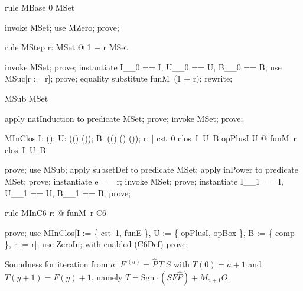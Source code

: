 \documentclass{article}
\begin{document}
\begin{theorem}{rule MBase}
  0 \in MSet
\end{theorem}

\begin{zproof}
invoke MSet;
use MZero;
prove;
\end{zproof}

\begin{theorem}{rule MStep}
  \forall r: MSet @ 1 + r \in MSet
\end{theorem}

\begin{zproof}
invoke MSet;
prove;
instantiate I\_\_0 == I, U\_\_0 == U, B\_\_0 == B;
use MSuc[r := r];
prove;
equality substitute funM~(1 + r);
rewrite;
\end{zproof}

\begin{theorem}{MSub}
  \nat \subseteq MSet
\end{theorem}

\begin{zproof}
apply natInduction to predicate \nat \subseteq MSet;
prove;
invoke MSet;
prove;
\end{zproof}

\begin{theorem}{MInClos}
  \forall I: \power (\nat \fun \nat); U: \power ((\nat \fun \nat) \fun (\nat \fun \nat)); B: \power ((\nat \fun \nat) \cross (\nat \fun \nat) \fun (\nat \fun \nat)); r: \nat |
    cst~0 \in clos~I~U~B \land opPlusI \in U @ funM~r \in clos~I~U~B
\end{theorem}

\begin{zproof}
prove;
use MSub;
apply subsetDef to predicate \nat \subseteq MSet;
apply inPower to predicate \nat \in \power MSet;
prove;
instantiate e == r;
invoke MSet;
prove;
instantiate I\_\_1 == I, U\_\_1 == U, B\_\_1 == B;
prove;
\end{zproof}

\begin{theorem}{rule MInC6}
  \forall r: \nat @ funM~r \in C6
\end{theorem}

\begin{zproof}
prove;
use MInClos[I := \{ cst~1, funE \}, U := \{ opPlusI, opBox \}, B := \{ comp \}, r := r];
use ZeroIn;
with enabled (C6Def) prove;
\end{zproof}

Soundness for iteration from $a$: $F^{\square(a)} = \hat P\,T^\square S$ with $T(0) = a + 1$ and
$T(y+1) = F(y) + 1$, namely $T = \mathrm{Sgn}\cdot(S F \hat P) + M_{a+1} O$.
\end{document}
